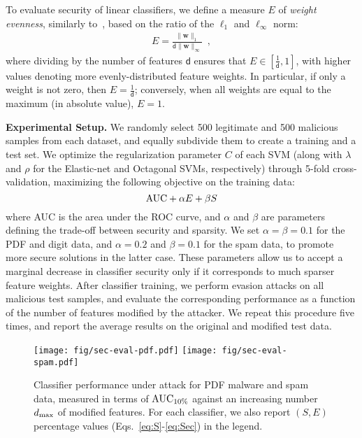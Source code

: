 \documentclass[runningheads,a4paper]{llncs}
\newcommand{\vct}[1]{\ensuremath{\boldsymbol{#1}}}
\newcommand{\con}[1]{\ensuremath{\mathsf{#1}}}
\newcommand{\myparagraph}[1]{\smallskip \noindent \textbf{#1.}}
\begin{document}
To evaluate security of linear classifiers, we define a measure $E$ of \emph{weight evenness}, similarly to~\cite{kolcz09,biggio10-ijmlc}, based on the ratio of the $\ell_{1}$ and $\ell_{\infty}$ norm:
\begin{eqnarray}
\label{eq:Sec}
E =  \frac{ \| \vct w \|_1 }{ \con d \| \vct w \|_{\infty}} \enspace ,
\end{eqnarray} 
where dividing by the number of features $\con d$ ensures that $E \in \left [\frac{1}{\con d},1\right]$, with higher values denoting more evenly-distributed feature weights. In particular, if only a weight is not zero, then $E=\frac{1}{\con d}$; conversely, when all weights are equal to the maximum (in absolute value), $E=1$.

\myparagraph{Experimental Setup} We randomly select 500 legitimate and 500 malicious samples from each dataset, and equally subdivide them to create a training and a test set. 
We optimize the regularization parameter $C$ of each SVM (along with $\lambda$ and $\rho$ for the Elastic-net and Octagonal SVMs, respectively) through 5-fold cross-validation,
maximizing the following objective on the training data:
\begin{equation}
{\rm AUC} + \alpha E+ \beta S 
\end{equation}
 where AUC is the area under the ROC curve, and $\alpha$ and $\beta$ are parameters defining the trade-off between security and sparsity.
We set $\alpha=\beta=0.1$ for the PDF and digit data, and $\alpha=0.2$ and $\beta=0.1$ for the spam data, to promote more secure solutions in the latter case. These parameters allow us to accept a marginal decrease in classifier security only if it corresponds to much sparser feature weights.
After classifier training, we perform evasion attacks on all malicious test samples, and evaluate the corresponding performance as a function of the number of features modified by the attacker. 
We repeat this procedure five times, and report the average results on the original and modified test data.

\begin{figure*}[t]
	\centering
	\texttt{[image: fig/sec-eval-pdf.pdf]}
	\texttt{[image: fig/sec-eval-spam.pdf]}
	\caption{Classifier performance under attack for PDF malware and spam data, measured in terms of ${\rm AUC}_{10\%}$ against an increasing number $d_{\rm max}$ of modified features. For each classifier, we also report $(S,E)$ percentage values (Eqs.~\ref{eq:S}-\ref{eq:Sec}) in the legend.}
	\label{fig:real_app_under_attack}
\end{figure*}
\end{document}
